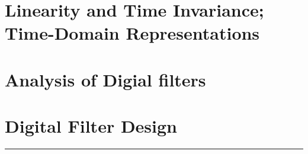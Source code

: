 \documentclass[10pt]{article}
\begin{document}
\newcommand{\josquote}[1]{
    \framebox{
    \parbox{\textwidth}{
    \textit{#1}
    }
    }
}

\newcommand{\paulhint}[1]{
    #1
}

\setlength\parindent{0pt}
\section{Linearity and Time Invariance; Time-Domain Representations}
%
%
%
%
%
\section{Analysis of Digial filters}
%
%
%
%
%
\section{Digital Filter Design}
%
%
%
%
%
%
%
%
%
%
%
%
%
\noindent\rule[0.5ex]{\linewidth}{0.5pt}

\end{document}
